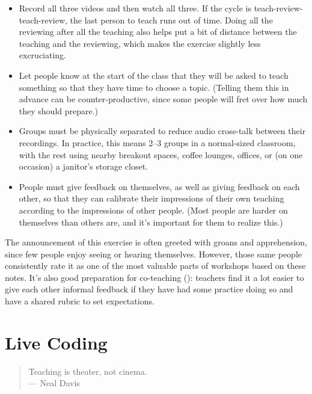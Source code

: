 \begin{itemize}

  \item
    Record all three videos and then watch all three.  If the cycle is
    teach-review-teach-review, the last person to teach runs out of
    time. Doing all the reviewing after all the teaching also helps
    put a bit of distance between the teaching and the reviewing,
    which makes the exercise slightly less excruciating.

  \item
    Let people know at the start of the class that they will be asked
    to teach something so that they have time to choose a topic.
    (Telling them this in advance can be counter-productive, since
    some people will fret over how much they should prepare.)

  \item
    Groups must be physically separated to reduce audio cross-talk
    between their recordings. In practice, this means 2--3 groups in a
    normal-sized classroom, with the rest using nearby breakout
    spaces, coffee lounges, offices, or (on one occasion) a janitor's
    storage closet.

  \item
    People must give feedback on themselves, as well as giving
    feedback on each other, so that they can calibrate their
    impressions of their own teaching according to the impressions of
    other people. (Most people are harder on themselves than others
    are, and it's important for them to realize this.)

\end{itemize}

The announcement of this exercise is often greeted with groans and
apprehension, since few people enjoy seeing or hearing themselves.
However, those same people consistently rate it as one of the most
valuable parts of workshops based on these notes.  It's also good
preparation for co-teaching (): teachers
find it a lot easier to give each other informal feedback if they have
had some practice doing so and have a shared rubric to set
expectations.

\section{Live Coding}\label{s:performance-live}

\begin{quote}

  Teaching is theater, not cinema.\\
  --- Neal Davis

\end{quote}

